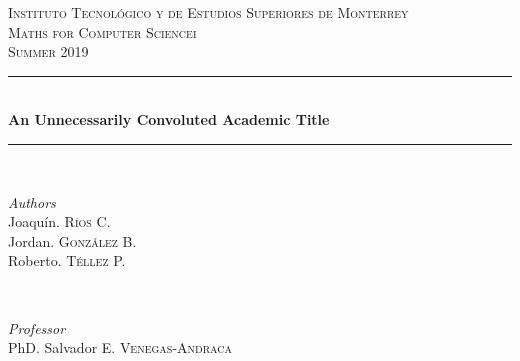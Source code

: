 \documentclass[12pt, a4paper]{article}
\begin{document}
	
	
	\begin{titlepage} %
		\newcommand{\HRule}{\rule{\linewidth}{0.5mm}} %
		
		\center %
		
		
		\textsc{\LARGE Instituto Tecnológico y de Estudios Superiores de Monterrey}\\[1.5cm] %
		
		\textsc{\Large Maths for Computer Sciencei}\\[0.5cm] %
		
		\textsc{\large Summer 2019}\\[0.5cm] %
		
		
		\HRule\\[0.4cm]
		
		{\huge\bfseries An Unnecessarily Convoluted Academic Title}\\[0.4cm] %
		
		\HRule\\[1.5cm]
		
		
		\begin{minipage}{0.4\textwidth}
			\begin{flushleft}
				\large
				\textit{Authors}\\
				Joaquín. \textsc{Ríos C.}\\
				Jordan. \textsc{González B.}\\
				Roberto. \textsc{Téllez P.} %
			\end{flushleft}
		\end{minipage}
		~
		\begin{minipage}{0.4\textwidth}
			\begin{flushright}
				\large
				\textit{Professor}\\
				PhD. Salvador E. \textsc{Venegas-Andraca} %
			\end{flushright}
		\end{minipage}
		

\end{titlepage}
\end{document}
